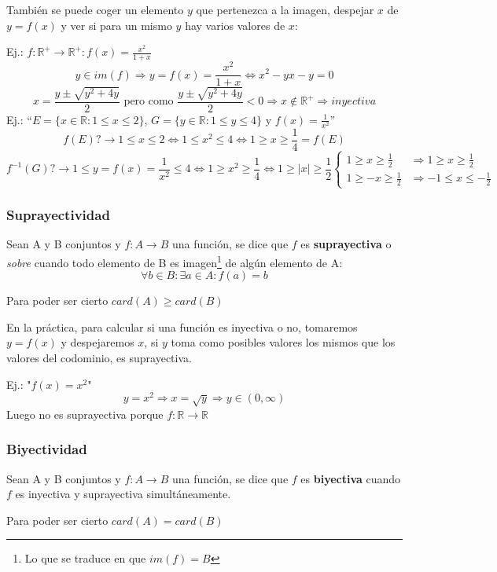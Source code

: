 \documentclass[10pt,a4paper,openright]{book}
\theoremstyle{break}
\begin{document}
También se puede coger un elemento $y$ que pertenezca a la imagen, despejar $x$ de $y=f(x)$ y ver si para un mismo $y$ hay varios valores de $x$:\par
Ej.: $f: \mathbb R^+ \rightarrow \mathbb R^+ : f(x)=\frac{x^2}{1+x}$
$$y\in im(f)\Rightarrow y=f(x)=\frac{x^2}{1+x}\Leftrightarrow x^2-yx-y=0$$
$$x=\frac{y\pm \sqrt{y^2+4y}}{2}\mbox{ pero como }\frac{y\pm \sqrt{y^2+4y}}{2}<0\Rightarrow x\notin \mathbb R^+\Rightarrow inyectiva$$
Ej.: ``$E=\{x\in \mathbb R : 1\leq x\leq 2\}$, $G=\{y\in \mathbb R : 1\leq y\leq 4\}$ y $f(x)=\frac{1}{x^2}$''
$$f(E)?\rightarrow 1\leq x\leq 2\Leftrightarrow 1\leq x^2\leq 4\Leftrightarrow 1\geq x\geq \frac{1}{4}=f(E)$$
$$f^{-1}(G)?\rightarrow 1\leq y=f(x)=\frac{1}{x^2}\leq 4\Leftrightarrow 1\geq x^2\geq \frac{1}{4}\Leftrightarrow 1\geq |x|\geq \frac{1}{2} 
\begin{cases}
1\geq x\geq \frac{1}{2}& \Rightarrow 1\geq x\geq \frac{1}{2} \\
1\geq -x\geq \frac{1}{2}& \Rightarrow -1\leq x\leq -\frac{1}{2}
\end{cases}$$

\subsubsection{Suprayectividad}
Sean A y B conjuntos y $f: A \rightarrow B$ una función, se dice que $f$ es \textbf{suprayectiva} o \textit{sobre} cuando todo elemento de B es imagen\footnote{Lo que se traduce en que $im(f)=B$} de algún elemento de A:
$$\forall b \in B : \exists a \in A : f(a)=b$$

Para poder ser cierto $card(A)\geq card(B)$\par

En la práctica, para calcular si una función es inyectiva o no, tomaremos $y=f(x)$ y despejaremos $x$, si $y$ toma como posibles valores los mismos que los valores del codominio, es suprayectiva.\par

Ej.:  "$f(x)=x^2$"
$$y=x^2\Rightarrow x=\sqrt{y}\Rightarrow y\in (0,\infty)$$
Luego no es suprayectiva porque $f: \mathbb R \rightarrow \mathbb R$

\subsubsection{Biyectividad}
Sean A y B conjuntos y $f: A \rightarrow B$ una función, se dice que $f$ es \textbf{biyectiva} cuando $f$ es inyectiva y suprayectiva simultáneamente.\par
Para poder ser cierto $card(A) = card(B)$
\end{document}
